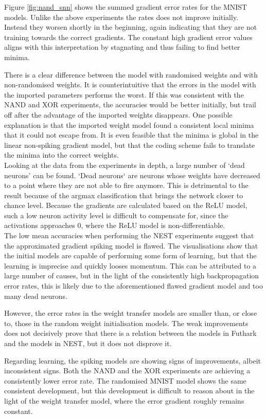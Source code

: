 \documentclass[report.tex]{subfiles}
\begin{document}
Figure \ref{fig:nand_snn} shows the summed gradient error rates for the MNIST
models.
Unlike the above experiments the rates does not improve initially.
Instead they worsen shortly in the beginning, again indicating that they are not training towards
the correct gradients.
The constant high gradient error values aligns with this interpretation by
stagnating and thus failing to find better minima.

There is a clear difference between the model with randomised weights and with
non-randomised weights.
It is counterintuitive that the errors in the model with the imported parameters
performs the worst.
If this was consistent with the NAND and XOR experiments, the accuracies would
be better initially, but trail off after the advantage of the
imported weights disappears.
One possible explanation is that the imported weight model found a consistent
local minima that it could not escape from.
It is even feasible that the minima is global in the linear non-spiking gradient
model, but that the coding scheme fails to translate the minima into the correct
weights.
\\[0.1cm]

Looking at the data from the experiments in depth, a large number of 
`dead neurons' can be found.
`Dead neurons` are neurons whose weights have decreased to a point where they are not able to
fire anymore.
This is detrimental to the result because of the argmax classification that
brings the network closer to chance level.
Because the gradients are calculated based on the ReLU model, such a low neuron
activity level is difficult to compensate for, since the activations approaches
0, where the ReLU model is non-differentiable.
\\[0.1cm]

The low mean accuracies when performing the NEST experiments suggest that the approximated
gradient spiking model is flawed.
The visualisations show that the initial models are capable of performing some form of
learning, but that the learning is imprecise and quickly looses
momentum.
This can be attributed to a large number of causes, but in the light of the
consistently high backpropagation error rates, this is likely due to the
aforementioned flawed gradient model and too many dead neurons.

However, the error rates in the weight transfer models are smaller than, or
close to, those in the random weight initialisation models.
The weak improvements does not decisively prove that there is a relation between
the models in Futhark and the models in NEST, but it does not disprove it.

Regarding learning, the spiking models are showing signs of 
improvements, albeit inconsistent signs. 
Both the NAND and the XOR experiments are achieving a consistently lower error
rate.
The randomised MNIST model shows the same consistent development, but this
development is difficult to reason about in the light of the weight transfer
model, where the error gradient roughly remains constant.
\end{document}
